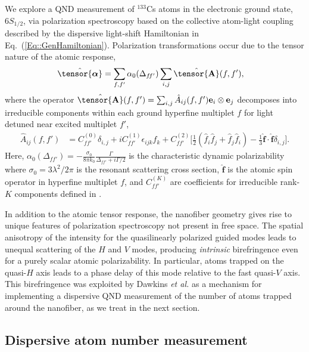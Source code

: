 \documentclass[preprint, aps,pra,onecolumn]{revtex4-1} %
\newcommand{\erf}[1]{Eq.~(\ref{#1})}
\newcommand{\mbf}[1]{\mathbf{#1}}
\newcommand{\smallfrac}[2]{\mbox{$\frac{#1}{#2}$}}
\newcommand{\poltens}{\hat{\tensor{\boldsymbol{\alpha}}}}
\newcommand{\charpol}{\alpha_0(\Delta_{f\!f'})}
\begin{document}
We explore a QND measurement of ${}^{133}$Cs atoms in the electronic ground state, $6S_{1/2}$, via polarization spectroscopy based on the collective atom-light coupling described by the dispersive light-shift Hamiltonian in \erf{Eq::GenHamiltonian}. Polarization transformations occur due to the tensor nature of the atomic response,
	\begin{align} \label{Eq::Polarizability}
		\poltens &=  \sum_{f,f'} \charpol \sum_{i,j} \hat{\tensor{\mbf{A}}}(f,f'),
	\end{align}
where the operator $\hat{\tensor{\mbf{A}}}(f,f') = \sum_{i,j} \hat{A}_{ij}(f,f')\mathbf{e}_i \otimes \mathbf{e}_j$ decomposes into irreducible components within each ground hyperfine multiplet $f$ for light detuned near excited multiplet $f'$,  
	\begin{align} \label{Eq::PolarizabilityIrrep}
		\hat{A}_{ij}(f,f')&=  C_{ff'}^{(0)} \delta_{i,j}+ iC_{ff'}^{(1)}\epsilon_{ijk}\hat{f}_k+ C_{ff'}^{(2)} \Big[ \smallfrac{1}{2} ( \hat{f}_i\hat{f}_j +\hat{f}_j\hat{f}_i )-\smallfrac{1}{3} \hat{\mathbf{f}}\!\cdot\!\hat{\mathbf{f}} \delta_{i,j} \Big]. 
\end{align}
Here, $\charpol = -\frac{\sigma_0}{8\pi k_0}\frac{\Gamma }{\Delta_{ff'}+i\Gamma/2}$ is the characteristic dynamic polarizability where $\sigma_0 = 3 \lambda^2/2\pi$ is the resonant scattering cross section, $\hat{\mathbf{f}}$ is the atomic  spin operator in hyperfine multiplet $f$, and $C_{ff'}^{(K)}$ are coefficients for irreducible rank-$K$ components defined in \cite{deutsch_quantum_2010}. 

In addition to the atomic tensor response, the nanofiber geometry gives rise to unique features of polarization spectroscopy not present in free space.  The spatial anisotropy of the intensity for the quasilinearly polarized guided modes leads to unequal scattering of the $H$ and $V$ modes, producing \emph{intrinsic} birefringence even for a purely scalar atomic polarizability.  
In particular, atoms trapped on the quasi-$H$ axis leads to a phase delay of this mode relative to the fast quasi-$V$ axis. 
This birefringence was exploited by Dawkins {\em et al.} \cite{dawkins_dispersive_2011} as a mechanism for implementing a dispersive QND measurement of the number of atoms trapped around the nanofiber, as we treat in the next section. 


	\subsection{Dispersive atom number measurement} \label{Sec::AtomNumberMeasurement}
\end{document}
